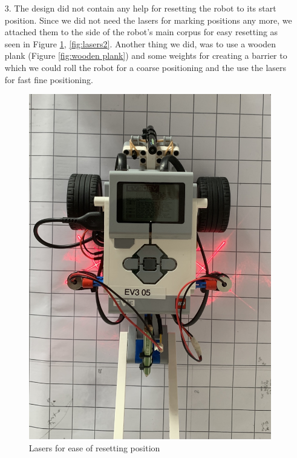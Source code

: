 \begin{itemize}
\begin{itemize}
                \item[3.] The design did not contain any help for resetting the robot to its start position. Since we did not need the lasers for marking positions any more, we attached them to the side of the robot's main corpus for easy resetting as seen in Figure \ref{fig:lasers}, \ref{fig:lasers2}. Another thing we did, was to use a wooden plank (Figure \ref{fig:wooden plank}) and some weights for creating a barrier to which we could roll the robot for a coarse positioning and the use the lasers for fast fine positioning.
                
                \begin{figure}[!ht] 
                        \centering \includegraphics[scale=5.0]{"images/experiment_2/experiment-2.png"}
                        \caption{Lasers for ease of resetting position}
                        \label{fig:lasers}
                \end{figure}
                

\end{itemize}
\end{itemize}
